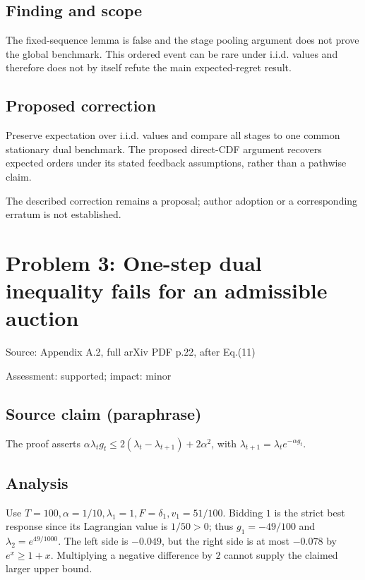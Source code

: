 \documentclass[11pt]{article}
\begin{document}
\subsection*{Finding and scope}

The fixed-sequence lemma is false and the stage pooling argument does not prove the global benchmark. This ordered event can be rare under i.i.d. values and therefore does not by itself refute the main expected-regret result.

\subsection*{Proposed correction}

Preserve expectation over i.i.d. values and compare all stages to one common stationary dual benchmark. The proposed direct-CDF argument recovers expected orders under its stated feedback assumptions, rather than a pathwise claim.

The described correction remains a proposal; author adoption or a corresponding erratum is not established.

\section*{Problem 3: One-step dual inequality fails for an admissible auction}

Source: Appendix A.2, full arXiv PDF p.22, after Eq.(11)

Assessment: supported; impact: minor

\subsection*{Source claim (paraphrase)}

The proof asserts \(\alpha\lambda_tg_t\leq2(\lambda_t-\lambda_{t+1})+2\alpha^2\), with \(\lambda_{t+1}=\lambda_te^{-\alpha g_t}\).

\subsection*{Analysis}

Use \(T=100,\alpha=1/10,\lambda_1=1,F=\delta_1,v_1=51/100\). Bidding \(1\) is the strict best response since its Lagrangian value is \(1/50>0\); thus \(g_1=-49/100\) and \(\lambda_2=e^{49/1000}\). The left side is \(-0.049\), but the right side is at most \(-0.078\) by \(e^x\geq1+x\). Multiplying a negative difference by \(2\) cannot supply the claimed larger upper bound.
\end{document}
